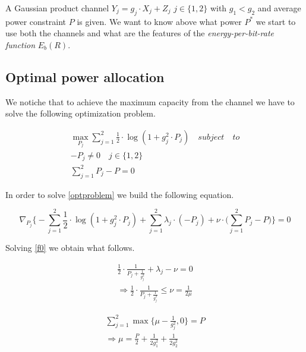 

A Gaussian product channel $Y_j = g_j \cdot X_j + Z_j$ $j\in \{1,2\}$ with $g_1 < g_2$ and average power constraint $P$ is given. We want to know above what power $P^*$ we start to use both the channels and what are the features of the \textit{energy-per-bit-rate function} $E_b(R)$.

\subsection{Optimal power allocation}


We notiche that to achieve the maximum capacity from the channel we have to solve the following optimization problem.

\begin{equation}
\begin{gathered}
	\max_{P_j} \sum_{j=1}^2 \frac{1}{2} \cdot \log(1+g_j^2 \cdot P_j) \quad subject \quad to\\
	-P_j \neq 0 \quad j\in \{1,2\} \\
	\sum_{j=1}^2 P_j - P = 0
\end{gathered}
\label{optproblem}
\end{equation}

In order to solve \eqref{optproblem} we build the following equation.

\begin{equation}
	\nabla_{P_j}\Big\{-\sum_{j=1}^2 \frac{1}{2} \cdot \log(1+g_j^2 \cdot P_j) + \sum_{j=1}^2 \lambda_j \cdot (-P_j) + \nu \cdot \Big(\sum_{j=1}^2 P_j - P\Big)  \Big\} = 0
	\label{f0}
\end{equation}

Solving \eqref{f0} we obtain what follows.

\begin{equation}
	\begin{gathered}
		\frac{1}{2} \cdot \frac{1}{P_j+\frac{1}{g_j^2}}+\lambda_j-\nu=0 \\
		\Rightarrow \frac{1}{2} \cdot \frac{1}{P_j+\frac{1}{g_j^2}} \leq \nu = \frac{1}{2\mu}
	\end{gathered}
\end{equation}

\begin{equation}
	\begin{gathered}
		\sum_{j=1}^2 \max\Big\{\mu - \frac{1}{g_j^2},0\Big\} = P \\
		\Rightarrow \mu = \frac{P}{2}+\frac{1}{2g_1^2} + \frac{1}{2g_2^2}
	\end{gathered}
\end{equation}

